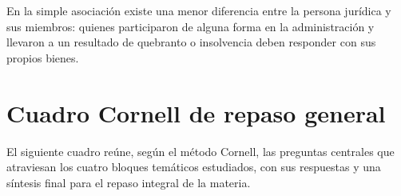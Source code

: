 \documentclass[12pt,oneside]{book}
\begin{document}
En la simple asociación existe una menor diferencia entre la persona jurídica y sus miembros: quienes participaron de alguna forma en la administración y llevaron a un resultado de quebranto o insolvencia deben responder con sus propios bienes.

\chapter{Cuadro Cornell de repaso general}

El siguiente cuadro reúne, según el método Cornell, las preguntas centrales que atraviesan los cuatro bloques temáticos estudiados, con sus respuestas y una síntesis final para el repaso integral de la materia.
\end{document}
